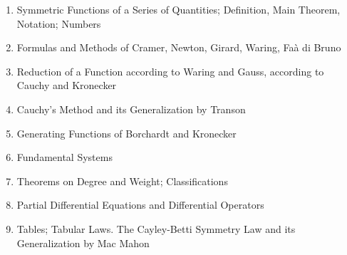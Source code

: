 \begin{enumerate}[itemsep=0pt]
    \item Symmetric Functions of a Series of Quantities; Definition, Main Theorem, Notation; Numbers
    \item Formulas and Methods of Cramer, Newton, Girard, Waring, Faà di Bruno
    \item Reduction of a Function according to Waring and Gauss, according to Cauchy and Kronecker
    \item Cauchy's Method and its Generalization by Transon
    \item Generating Functions of Borchardt and Kronecker
    \item Fundamental Systems
    \item Theorems on Degree and Weight; Classifications
    \item Partial Differential Equations and Differential Operators
    \item Tables; Tabular Laws. The Cayley-Betti Symmetry Law and its Generalization by Mac Mahon
\end{enumerate}
